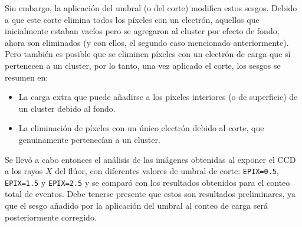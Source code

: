 Sin embargo, la aplicación del umbral (o del corte) modifica estos sesgos. Debido a que este corte elimina todos los píxeles con un electrón, aquellos que inicialmente estaban vacíos pero se agregaron al cluster por efecto de fondo, ahora son eliminados (y con ellos, el segundo caso mencionado anteriormente). Pero también es posible que se eliminen píxeles con un electrón de carga que sí pertenecen a un cluster, %
por lo tanto, una vez aplicado el corte, los sesgos se resumen en:
\begin{itemize}
    \item La carga extra que puede añadirse a los píxeles interiores (o de superficie) de un cluster debido al fondo.
    \item La eliminación de píxeles con un único electrón debido al corte, que genuinamente pertenecían a un cluster.
\end{itemize}

Se llevó a cabo entonces el análisis de las imágenes obtenidas al exponer el CCD a los rayos $X$ del flúor, con diferentes valores de umbral de corte: \verb|EPIX=0.5|, \verb|EPIX=1.5| y \verb|EPIX=2.5| y se comparó con los resultados obtenidos para el conteo total de eventos. 
Debe tenerse presente que estos son resultados preliminares, ya que el sesgo añadido por la aplicación del umbral al conteo de carga será posteriormente corregido.

